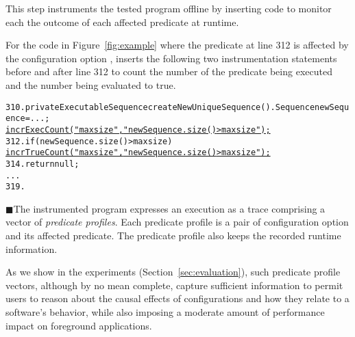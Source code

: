 This step instruments the tested program offline
by inserting code to monitor
each the outcome of each affected predicate at runtime.


For the code in Figure~\ref{fig:example} where
the predicate at line 312 is affected by
the configuration option , \ourtool inserts the
following two instrumentation
statements before and after line 312 to count the number of
the predicate being executed and the number being evaluated to true.


\begin{CodeOut}
\begin{alltt}
310. private ExecutableSequence createNewUniqueSequence() .   Sequence newSequence = ...; 
       \underline{incrExecCount("maxsize", "newSequence.size() > maxsize");}
312.   if (newSequence.size() > maxsize) \ttlcb
         \underline{incrTrueCount("maxsize", "newSequence.size() > maxsize");}
314.     return null;
      ...
319. \ttrcb
\end{alltt}
\end{CodeOut}


$\blacksquare$The instrumented program expresses an execution
as a trace comprising a vector of \textit{predicate profiles}.
Each predicate profile is a pair of configuration
option and its affected predicate.
The predicate profile also keeps the recorded runtime information.

As we
show in the experiments (Section~\ref{sec:evaluation}), such predicate profile
vectors, although by no mean complete, capture
sufficient information to permit users
to reason about the causal effects of configurations
and how they relate to a software's behavior, while
also imposing a moderate amount of performance impact
on foreground applications.





